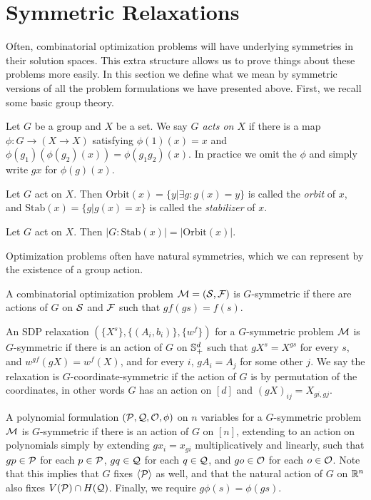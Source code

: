 \section{Symmetric Relaxations}
Often, combinatorial optimization problems will have underlying symmetries in their solution spaces. This extra structure allows us to prove things about these problems more easily. In this section we define what we mean by symmetric versions of all the problem formulations we have presented above. First, we recall some basic group theory.
\begin{definition}
Let $G$ be a group and $X$ be a set. We say \emph{$G$ acts on $X$} if there is a map $\phi: G \rightarrow (X \rightarrow X)$ satisfying $\phi(1)(x) = x$ and $\phi(g_1)(\phi(g_2)(x)) = \phi(g_1g_2)(x)$. In practice we omit the $\phi$ and simply write $gx$ for $\phi(g)(x)$.
\end{definition}
\begin{definition}
Let $G$ act on $X$. Then $\text{Orbit}(x) = \{y | \exists g: g(x) = y\}$ is called the \emph{orbit} of $x$, and $\text{Stab}(x) = \{g | g(x) = x\}$ is called the \emph{stabilizer} of $x$. 
\end{definition}
\begin{fact}
Let $G$ act on $X$. Then $|G: \text{Stab}(x)| = |\text{Orbit}(x)|$. 
\end{fact}

Optimization problems often have natural symmetries, which we can represent by the existence of a group action.
\begin{definition}
A combinatorial optimization problem $\mathcal M = (\mathcal S, \mathcal F)$ is $G$-symmetric if there are actions of $G$ on $\mathcal S$ and $\mathcal F$ such that $gf(gs) = f(s)$. 
\end{definition}

\begin{definition}
An SDP relaxation $(\{X^s\},\{(A_i,b_i)\},\{w^f\})$ for a $G$-symmetric problem $\mathcal M$ is $G$-symmetric if there is an action of $G$ on $\mathbb{S}^{d}_+$ such that $gX^s = X^{gs}$ for every $s$, and $w^{gf}(gX) = w^f(X)$, and for every $i$, $gA_i = A_j$ for some other $j$. We say the relaxation is $G$-coordinate-symmetric if the action of $G$ is by permutation of the coordinates, in other words $G$ has an action on $[d]$ and $(gX)_{ij} = X_{gi,gj}$.
\end{definition}

\begin{definition}
A polynomial formulation $(\mathcal P,\mathcal Q,\mathcal O,\phi)$ on $n$ variables for a $G$-symmetric problem $\mathcal M$ is $G$-symmetric if there is an action of $G$ on $[n]$, extending to an action on polynomials simply by extending $gx_i = x_{gi}$ multiplicatively and linearly, such that $gp \in \mathcal P$ for each $p \in \mathcal P$, $gq \in \mathcal Q$ for each $q \in \mathcal Q$, and $go \in \mathcal O$ for each $o \in \mathcal O$. Note that this implies that $G$ fixes $\langle \mathcal P \rangle$ as well, and that the natural action of $G$ on $\mathbb R^n$ also fixes $V(\mathcal P) \cap H(\mathcal Q)$. Finally, we require $g\phi(s) = \phi(gs)$.
\end{definition}

